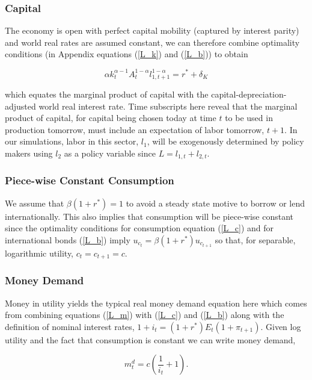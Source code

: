 \documentclass{OUP-EJ}
\begin{document}
\subsubsection{Capital}
The economy is open with perfect capital mobility (captured by interest parity) and world real rates are assumed constant, we can therefore combine optimality conditions (in Appendix equations (\ref{L_k}) and (\ref{L_b})) to obtain 

\begin{equation}
    \label{MPK=r}
    \alpha k_{t}^{\alpha-1}A_{t}^{1-\alpha}l_{1,{t+1}}^{1-\alpha} = r^*+ \delta_K
\end{equation}

which equates the marginal product of capital with the capital-depreciation-adjusted world real interest rate.  Time subscripts here reveal that the marginal product of capital, for capital being chosen today at time $t$ to be used in production tomorrow, must include an expectation of labor tomorrow, $t+1$.  In our simulations, labor in this sector, $l_1$, will be exogenously determined by policy makers using $l_2$ as a policy variable since $L=l_{1,t}+l_{2,t}$.

\subsubsection{Piece-wise Constant Consumption}
We assume that $\beta (1+r^*) = 1$ to avoid a steady state motive to borrow or lend internationally. This also implies that consumption will be piece-wise constant since the optimality conditions for consumption equation (\ref{L_c}) and for international bonds (\ref{L_b}) imply $u_{c_t}=\beta (1+r^*)u_{c_{t+1}}$ so that, for separable, logarithmic utility, $c_t = c_{t+1}=c$.

\subsubsection{Money Demand}
Money in utility yields the typical real money demand equation here which comes from combining equations (\ref{L_m}) with (\ref{L_c}) and (\ref{L_b}) along with the definition of nominal interest rates, $1+i_t=(1+r^*)E_t(1+\pi_{t+1})$.  Given log utility and the fact that consumption is constant we can write money demand,

\begin{equation}
    \label{m_d}
    m^d_t=c \left( \frac{1}{i_t}+1 \right).
\end{equation}
\end{document}

